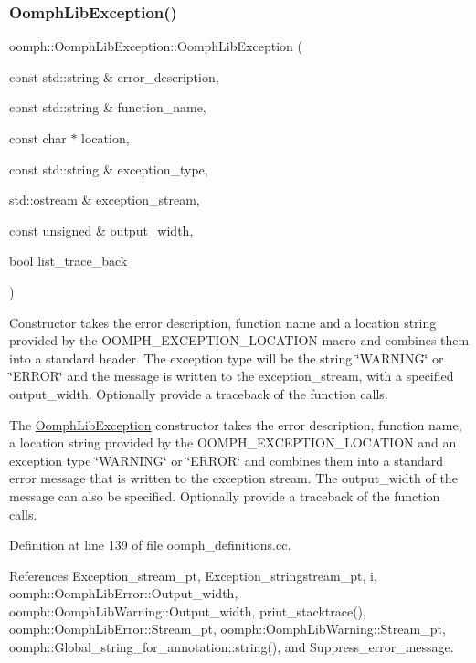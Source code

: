 \subsubsection{\texorpdfstring{Oomph\+Lib\+Exception()}{OomphLibException()}}
{\footnotesize\ttfamily oomph\+::\+Oomph\+Lib\+Exception\+::\+Oomph\+Lib\+Exception (\begin{DoxyParamCaption}\item[{const std\+::string \&}]{error\+\_\+description,  }\item[{const std\+::string \&}]{function\+\_\+name,  }\item[{const char $\ast$}]{location,  }\item[{const std\+::string \&}]{exception\+\_\+type,  }\item[{std\+::ostream \&}]{exception\+\_\+stream,  }\item[{const unsigned \&}]{output\+\_\+width,  }\item[{bool}]{list\+\_\+trace\+\_\+back }\end{DoxyParamCaption})\hspace{0.3cm}{\ttfamily [protected]}}



Constructor takes the error description, function name and a location string provided by the O\+O\+M\+P\+H\+\_\+\+E\+X\+C\+E\+P\+T\+I\+O\+N\+\_\+\+L\+O\+C\+A\+T\+I\+ON macro and combines them into a standard header. The exception type will be the string \char`\"{}\+W\+A\+R\+N\+I\+N\+G\char`\"{} or \char`\"{}\+E\+R\+R\+O\+R\char`\"{} and the message is written to the exception\+\_\+stream, with a specified output\+\_\+width. Optionally provide a traceback of the function calls. 

The \hyperlink{classoomph_1_1OomphLibException}{Oomph\+Lib\+Exception} constructor takes the error description, function name, a location string provided by the O\+O\+M\+P\+H\+\_\+\+E\+X\+C\+E\+P\+T\+I\+O\+N\+\_\+\+L\+O\+C\+A\+T\+I\+ON and an exception type \char`\"{}\+W\+A\+R\+N\+I\+N\+G\char`\"{} or \char`\"{}\+E\+R\+R\+O\+R\char`\"{} and combines them into a standard error message that is written to the exception stream. The output\+\_\+width of the message can also be specified. Optionally provide a traceback of the function calls. 

Definition at line 139 of file oomph\+\_\+definitions.\+cc.



References Exception\+\_\+stream\+\_\+pt, Exception\+\_\+stringstream\+\_\+pt, i, oomph\+::\+Oomph\+Lib\+Error\+::\+Output\+\_\+width, oomph\+::\+Oomph\+Lib\+Warning\+::\+Output\+\_\+width, print\+\_\+stacktrace(), oomph\+::\+Oomph\+Lib\+Error\+::\+Stream\+\_\+pt, oomph\+::\+Oomph\+Lib\+Warning\+::\+Stream\+\_\+pt, oomph\+::\+Global\+\_\+string\+\_\+for\+\_\+annotation\+::string(), and Suppress\+\_\+error\+\_\+message.

